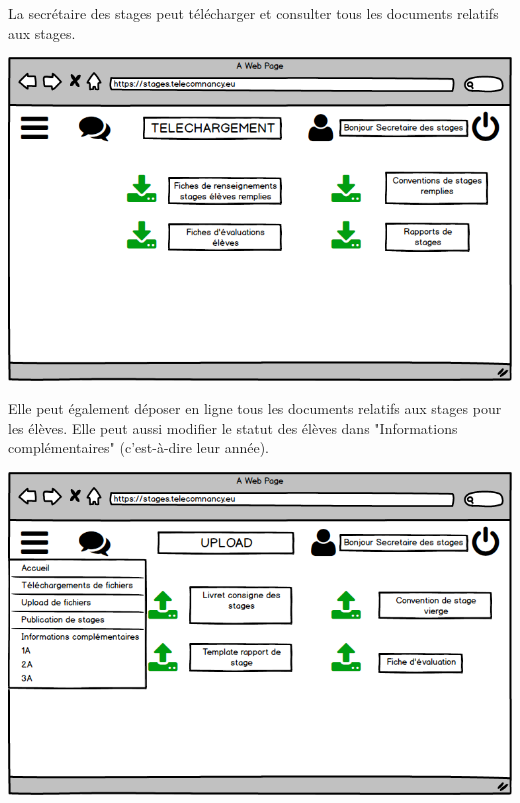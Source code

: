 \documentclass{scrreprt}
\begin{document}
\vspace{7cm}
\begin{flushleft}
\hspace{1cm}La secrétaire des stages peut télécharger et consulter tous les documents relatifs aux stages.
\end{flushleft}
\begin{center}
\centerline{\includegraphics[scale=0.65]{image/DownloadSecretaire.png}}
\end{center}
\vspace{8cm}
\begin{flushleft}
\hspace{1cm}Elle peut également déposer en ligne tous les documents relatifs aux stages pour les élèves. Elle peut aussi modifier le statut des élèves dans "Informations complémentaires" (c'est-à-dire leur année).
\end{flushleft}
\begin{center}
\centerline{\includegraphics[scale=0.65]{image/uploadsecretaire.png}}
\end{center}
\end{document}
